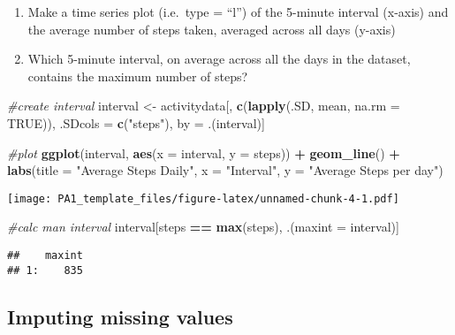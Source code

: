 \documentclass[
]{article}
\newenvironment{Shaded}{\begin{snugshade}}{\end{snugshade}}
\newcommand{\CommentTok}[1]{\textcolor[rgb]{0.56,0.35,0.01}{\textit{#1}}}
\newcommand{\DataTypeTok}[1]{\textcolor[rgb]{0.13,0.29,0.53}{#1}}
\newcommand{\KeywordTok}[1]{\textcolor[rgb]{0.13,0.29,0.53}{\textbf{#1}}}
\newcommand{\NormalTok}[1]{#1}
\newcommand{\OperatorTok}[1]{\textcolor[rgb]{0.81,0.36,0.00}{\textbf{#1}}}
\newcommand{\OtherTok}[1]{\textcolor[rgb]{0.56,0.35,0.01}{#1}}
\newcommand{\StringTok}[1]{\textcolor[rgb]{0.31,0.60,0.02}{#1}}
\providecommand{\tightlist}{%
  \setlength{\itemsep}{0pt}\setlength{\parskip}{0pt}}
\begin{document}
\begin{enumerate}
\def\labelenumi{\arabic{enumi}.}
\tightlist
\item
  Make a time series plot (i.e.~type = ``l'') of the 5-minute interval
  (x-axis) and the average number of steps taken, averaged across all
  days (y-axis)
\item
  Which 5-minute interval, on average across all the days in the
  dataset, contains the maximum number of steps?
\end{enumerate}

\begin{Shaded}
\begin{Highlighting}[]
\CommentTok{#create interval}
\NormalTok{interval <-}\StringTok{ }\NormalTok{activitydata[, }\KeywordTok{c}\NormalTok{(}\KeywordTok{lapply}\NormalTok{(.SD, mean, }\DataTypeTok{na.rm =} \OtherTok{TRUE}\NormalTok{)), .SDcols =}\StringTok{ }\KeywordTok{c}\NormalTok{(}\StringTok{"steps"}\NormalTok{), by =}\StringTok{ }\NormalTok{.(interval)]}

\CommentTok{#plot}
\KeywordTok{ggplot}\NormalTok{(interval, }\KeywordTok{aes}\NormalTok{(}\DataTypeTok{x =}\NormalTok{ interval, }\DataTypeTok{y =}\NormalTok{ steps)) }\OperatorTok{+}
\StringTok{        }\KeywordTok{geom_line}\NormalTok{() }\OperatorTok{+}
\StringTok{        }\KeywordTok{labs}\NormalTok{(}\DataTypeTok{title =} \StringTok{"Average Steps Daily"}\NormalTok{, }\DataTypeTok{x =} \StringTok{"Interval"}\NormalTok{, }\DataTypeTok{y =} \StringTok{"Average Steps per day"}\NormalTok{)}
\end{Highlighting}
\end{Shaded}

\texttt{[image: PA1\_template\_files/figure-latex/unnamed-chunk-4-1.pdf]}

\begin{Shaded}
\begin{Highlighting}[]
\CommentTok{#calc man interval}
\NormalTok{interval[steps }\OperatorTok{==}\StringTok{ }\KeywordTok{max}\NormalTok{(steps), .(}\DataTypeTok{maxint =}\NormalTok{ interval)]}
\end{Highlighting}
\end{Shaded}

\begin{verbatim}
##    maxint
## 1:    835
\end{verbatim}

\hypertarget{imputing-missing-values}{%
\subsection{Imputing missing values}\label{imputing-missing-values}}
\end{document}
